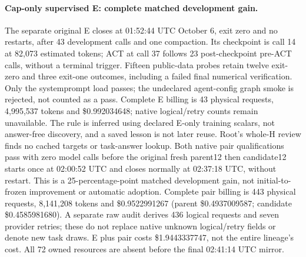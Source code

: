 \paragraph{Cap-only supervised E: complete matched development gain.}
The separate original E closes at 01:52:44 UTC October 6, exit zero and no
restarts, after 43 development calls and one compaction. Its checkpoint is
call 14 at 82{,}073 estimated tokens; ACT at call 37 follows 23 post-checkpoint
pre-ACT calls, without a terminal trigger. Fifteen public-data probes retain
twelve exit-zero and three exit-one outcomes, including a failed final
numerical verification. Only the systemprompt load passes; the undeclared
agent-config graph smoke is rejected, not counted as a pass.
Complete E billing is 43 physical requests, 4{,}995{,}537 tokens and
\$0.992034648; native logical/retry counts remain unavailable. The rule is
inferred using declared E-only training scalars, not answer-free discovery,
and a saved lesson is not later reuse. Root's whole-H review finds no cached
targets or task-answer lookup. Both native pair qualifications pass with
zero model calls before the original fresh parent12 then candidate12 starts
once at 02:00:52 UTC and closes normally at 02:37:18 UTC, without restart.
 This is a 25-percentage-point
matched development gain, not initial-to-frozen improvement or automatic
adoption. Complete pair billing is 443 physical requests, 8{,}141{,}208 tokens
and \$0.9522991267 (parent \$0.4937009587; candidate \$0.4585981680).
A separate raw audit derives 436 logical requests and seven provider retries;
these do not replace native unknown logical/retry fields or denote new task
draws. E plus pair costs \$1.9443337747, not the entire lineage's cost.
All 72 owned resources are absent before the final 02:41:14 UTC mirror.

